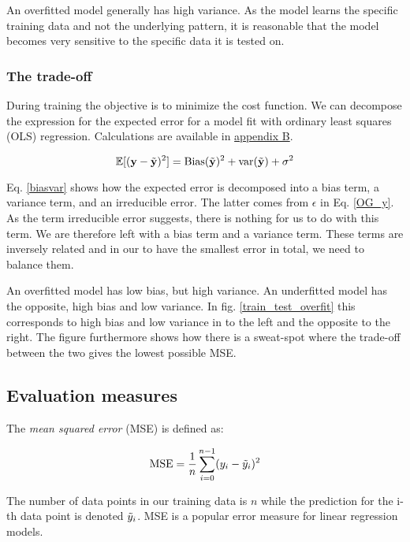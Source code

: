 An overfitted model generally has high variance. As the model learns the specific training data and not the underlying pattern, it is reasonable that the model becomes very sensitive to the specific data it is tested on.

\subsubsection{The trade-off}


During training the objective is to minimize the cost function.  We can decompose the expression for the expected error for a model fit with ordinary least squares (OLS) regression. Calculations are available in \hyperref[appendixB]{appendix B}.

\begin{equation}\label{biasvar}
    \mathbb{E}[(\mathbf{y} - \Tilde{\mathbf{y}})^2] = \text{Bias}(\Tilde{\mathbf{y}})^2 + \text{var}(\Tilde{\mathbf{y}}) + \sigma^2
\end{equation}

Eq. \ref{biasvar} shows how the expected error is decomposed into a bias term, a variance term, and an irreducible error. The latter comes from $\epsilon$ in Eq. \ref{OG_y}. As the term irreducible error suggests, there is nothing for us to do with this term. We are therefore left with a bias term and a variance term. These terms are inversely related and in our to have the smallest error in total, we need to balance them. 

An overfitted model has low bias, but high variance. An underfitted model has the opposite, high bias and low variance. In fig. \ref{train_test_overfit} this corresponds to high bias and low variance in to the left and the opposite to the right. The figure furthermore shows how there is a sweat-spot where the trade-off between the two gives the lowest possible MSE.


\subsection{Evaluation measures}

The \emph{mean squared error} (MSE) is defined as: 

\begin{equation}\label{mse}
    \text{MSE} = \frac{1}{n}\sum_{i=0}^{n-1}(y_i-\Tilde{y}_i)^2
\end{equation}

The number of data points in our training data is $n$ while the prediction for the i-th data point is denoted $\Tilde{y}_i$. MSE is a popular error measure for linear regression models. 

